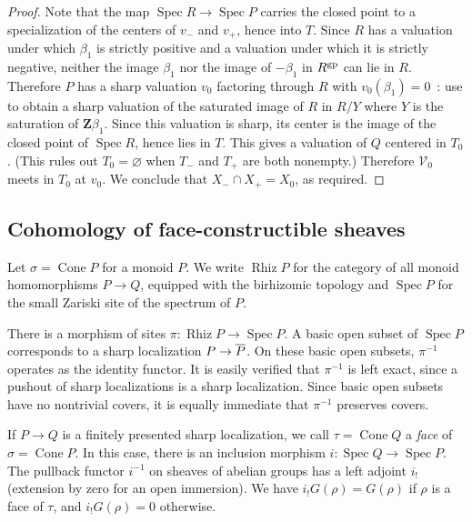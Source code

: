 \documentclass[10pt]{article}
\numberwithin{equation}{section}
\theoremstyle{definition}
\theoremstyle{remark}
\def\Cone{\operatorname{Cone}}
\def\cone{\Cone}
\def\Spec{\operatorname{Spec}}
\def\spec{\Spec}
\def\Rh{\operatorname{Rhiz}}
\renewcommand{\bar}[1]{\overnorm{#1}\vphantom{#1}}
\def\overnorm#1{\overline{#1}\vphantom{#1}}
\begin{document}
\begin{proof}
	Note that the map $\spec R \to \spec P$ carries the closed point to a specialization of the centers of $v_-$ and $v_+$, hence into $T$.  Since $R$ has a valuation under which $\beta_1$ is strictly positive and a valuation under which it is strictly negative, neither the image $\beta_1$ nor the image of $-\beta_1$ in $R^{\rm gp}$ can lie in $R$.  Therefore $P$ has a sharp valuation $v_0$ factoring through $R$ with $v_0(\beta_1) = 0$~: use \cite[Proposition~I.2.4.1]{ogusloggeom} to obtain a sharp valuation of the saturated image of $R$ in $R / Y$ where $Y$ is the saturation of $\mathbf Z \beta_1$.  Since this valuation is sharp, its center is the image of the closed point of $\spec R$, hence lies in $T$.  This gives a valuation of $Q$ centered in $T_0$.  (This rules out $T_0 = \varnothing$ when $T_-$ and $T_+$ are both nonempty.)  Therefore $\mathcal V_0$ meets in $T_0$ at $v_0$.  We conclude that $X_- \cap X_+ = X_0$, as required.
\end{proof}






\subsection{Cohomology of face-constructible sheaves}


Let $\sigma = \Cone P$ for a monoid $P$.  We write $\Rh P$ for the category of all monoid homomorphisms $P \to Q$, equipped with the birhizomic topology and $\spec P$ for the small Zariski site of the spectrum of $P$. 





There is a morphism of sites $\pi : \Rh P \to \spec P$.  A basic open subset of $\spec P$ corresponds to a sharp localization $P \to \bar P$.  On these basic open subsets, $\pi^{-1}$ operates as the identity functor.  It is easily verified that $\pi^{-1}$ is left exact, since a pushout of sharp localizations is a sharp localization.  Since basic open subsets have no nontrivial covers, it is equally immediate that $\pi^{-1}$ preserves covers.





If $P \to Q$ is a finitely presented sharp localization, we call $\tau = \cone Q$ a \emph{face} of $\sigma = \cone P$.  In this case, there is an inclusion morphism $i : \spec Q \to \spec P$.  The pullback functor $i^{-1}$ on sheaves of abelian groups has a left adjoint $i_!$ (extension by zero for an open immersion).  We have $i_! G(\rho) = G(\rho)$ if $\rho$ is a face of $\tau$, and $i_! G(\rho) = 0$ otherwise.  
\end{document}
